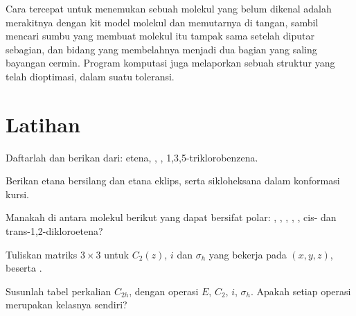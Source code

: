 \begin{inthelab}
Cara tercepat untuk menemukan  sebuah molekul yang belum
dikenal adalah merakitnya dengan kit model molekul dan memutarnya di tangan,
sambil mencari sumbu yang membuat molekul itu tampak sama setelah diputar
sebagian, dan bidang yang membelahnya menjadi dua bagian yang saling bayangan
cermin. Program komputasi juga melaporkan  sebuah struktur yang
telah dioptimasi, dalam suatu toleransi.
\end{inthelab}

\section{Latihan}

\begin{exercise}[$\star$]\label{exo:b3:point-groups:1}
Daftarlah  dan berikan  dari: etena, ,
, 1,3,5-triklorobenzena.
\end{exercise}

\begin{exercise}[$\star$]\label{exo:b3:point-groups:2}
Berikan  etana bersilang dan etana eklips, serta 
sikloheksana dalam konformasi kursi.
\end{exercise}

\begin{exercise}[$\star$]\label{exo:b3:point-groups:3}
Manakah di antara molekul berikut yang dapat bersifat polar: ,
, , , , cis- dan trans-1,2-dikloroetena?
\end{exercise}

\begin{exercise}[$\star$]\label{exo:b3:point-groups:4}
Tuliskan matriks $3\times3$ untuk $C_2(z)$, $i$ dan $\sigma_h$ yang bekerja pada
$(x, y, z)$, beserta .
\end{exercise}

\begin{exercise}[$\star\star$]\label{exo:b3:point-groups:5}
Susunlah tabel perkalian $C_{2h}$, dengan operasi $E$, $C_2$, $i$, $\sigma_h$.
Apakah setiap operasi merupakan kelasnya sendiri?
\end{exercise}

